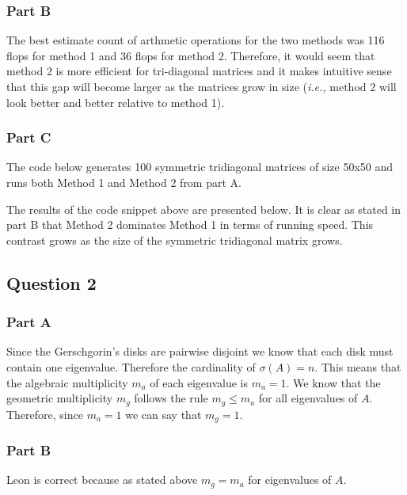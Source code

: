 \subsubsection{Part B}

The best estimate count of arthmetic operations for the two methods was 116 flops for method 1 and 36 flops for method 2.
Therefore, it would seem that method 2 is more efficient for tri-diagonal matrices and it makes intuitive sense that this gap will become larger as the matrices grow in size ({\em i.e.,} method 2 will look better and better relative to method 1).

\newpage
\subsubsection{Part C}

The code below generates 100 symmetric tridiagonal matrices of size 50x50 and runs both Method 1 and Method 2 from part A.


The results of the code snippet above are presented below.
It is clear as stated in part B that Method 2 dominates Method 1 in terms of running speed.
This contrast grows as the size of the symmetric tridiagonal matrix grows.


\newpage
\subsection{Question 2}
\subsubsection{Part A}

Since the Gerschgorin's disks are pairwise disjoint we know that each disk must contain one eigenvalue.
Therefore the cardinality of \(\sigma(A) = n\).
This means that the algebraic multiplicity \(m_a\) of each eigenvalue is \(m_a = 1\).
We know that the geometric multiplicity \(m_g\) follows the rule \(m_g \leq m_a\) for all eigenvalues of \(A\).
Therefore, since \(m_a = 1\) we can say that \(m_g = 1\). 

\subsubsection{Part B}

Leon is correct because as stated above \(m_g = m_a\) for eigenvalues of \(A\).


